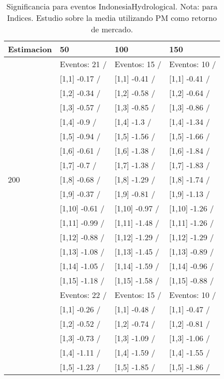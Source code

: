 \begin{table}

\caption{Significancia para eventos IndonesiaHydrological. Nota: para Indices. Estudio sobre la media utilizando PM como retorno de mercado.}
\centering
\begin{tabular}[t]{llll}
\toprule
Estimacion & 50 & 100 & 150\\
\midrule
 & Eventos:  21 / & Eventos:  15 / & Eventos:  10 /\\
 & {}[1,1] -0.17  / & {}[1,1] -0.41  / & {}[1,1] -0.41  /\\
 & {}[1,2] -0.34  / & {}[1,2] -0.58  / & {}[1,2] -0.64  /\\
 & {}[1,3] -0.57  / & {}[1,3] -0.85  / & {}[1,3] -0.86  /\\
 & {}[1,4] -0.9  / & {}[1,4] -1.3  / & {}[1,4] -1.34  /\\
\addlinespace
 & {}[1,5] -0.94  / & {}[1,5] -1.56  / & {}[1,5] -1.66  /\\
 & {}[1,6] -0.61  / & {}[1,6] -1.38  / & {}[1,6] -1.84  /\\
 & {}[1,7] -0.7  / & {}[1,7] -1.38  / & {}[1,7] -1.83  /\\
200 & {}[1,8] -0.68  / & {}[1,8] -1.29  / & {}[1,8] -1.74  /\\
 & {}[1,9] -0.37  / & {}[1,9] -0.81  / & {}[1,9] -1.13  /\\
\addlinespace
 & {}[1,10] -0.61  / & {}[1,10] -0.97  / & {}[1,10] -1.26  /\\
 & {}[1,11] -0.99  / & {}[1,11] -1.48  / & {}[1,11] -1.26  /\\
 & {}[1,12] -0.88  / & {}[1,12] -1.29  / & {}[1,12] -1.29  /\\
 & {}[1,13] -1.08  / & {}[1,13] -1.45  / & {}[1,13] -0.89  /\\
 & {}[1,14] -1.05  / & {}[1,14] -1.59  / & {}[1,14] -0.96  /\\
\addlinespace
 & {}[1,15] -1.18  / & {}[1,15] -1.58  / & {}[1,15] -0.88  /\\
 & Eventos:  22 / & Eventos:  15 / & Eventos:  10 /\\
 & {}[1,1] -0.26  / & {}[1,1] -0.48  / & {}[1,1] -0.47  /\\
 & {}[1,2] -0.52  / & {}[1,2] -0.74  / & {}[1,2] -0.81  /\\
 & {}[1,3] -0.73  / & {}[1,3] -1.09  / & {}[1,3] -1.06  /\\
\addlinespace
 & {}[1,4] -1.11  / & {}[1,4] -1.59  / & {}[1,4] -1.55  /\\
 & {}[1,5] -1.23  / & {}[1,5] -1.85  / & {}[1,5] -1.86  /\\

\end{tabular}
\end{table}
